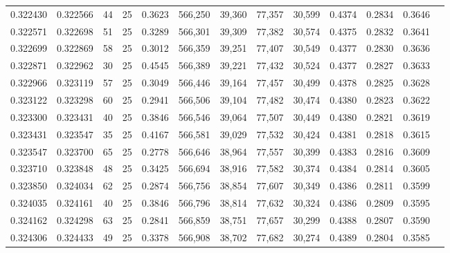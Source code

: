 \begin{tabular}{rrrrrrrrrrrrr}
0.322430 & 0.322566 &    44 &  25 &                                     0.3623 & 566,250 &  39,360 &  77,357 &  30,599 & 0.4374 & 0.2834 & 0.3646 \\
0.322571 & 0.322698 &    51 &  25 &                                     0.3289 & 566,301 &  39,309 &  77,382 &  30,574 & 0.4375 & 0.2832 & 0.3641 \\
0.322699 & 0.322869 &    58 &  25 &                                     0.3012 & 566,359 &  39,251 &  77,407 &  30,549 & 0.4377 & 0.2830 & 0.3636 \\
0.322871 & 0.322962 &    30 &  25 &                                     0.4545 & 566,389 &  39,221 &  77,432 &  30,524 & 0.4377 & 0.2827 & 0.3633 \\
0.322966 & 0.323119 &    57 &  25 &                                     0.3049 & 566,446 &  39,164 &  77,457 &  30,499 & 0.4378 & 0.2825 & 0.3628 \\
0.323122 & 0.323298 &    60 &  25 &                                     0.2941 & 566,506 &  39,104 &  77,482 &  30,474 & 0.4380 & 0.2823 & 0.3622 \\
0.323300 & 0.323431 &    40 &  25 &                                     0.3846 & 566,546 &  39,064 &  77,507 &  30,449 & 0.4380 & 0.2821 & 0.3619 \\
0.323431 & 0.323547 &    35 &  25 &                                     0.4167 & 566,581 &  39,029 &  77,532 &  30,424 & 0.4381 & 0.2818 & 0.3615 \\
0.323547 & 0.323700 &    65 &  25 &                                     0.2778 & 566,646 &  38,964 &  77,557 &  30,399 & 0.4383 & 0.2816 & 0.3609 \\
0.323710 & 0.323848 &    48 &  25 &                                     0.3425 & 566,694 &  38,916 &  77,582 &  30,374 & 0.4384 & 0.2814 & 0.3605 \\
0.323850 & 0.324034 &    62 &  25 &                                     0.2874 & 566,756 &  38,854 &  77,607 &  30,349 & 0.4386 & 0.2811 & 0.3599 \\
0.324035 & 0.324161 &    40 &  25 &                                     0.3846 & 566,796 &  38,814 &  77,632 &  30,324 & 0.4386 & 0.2809 & 0.3595 \\
0.324162 & 0.324298 &    63 &  25 &                                     0.2841 & 566,859 &  38,751 &  77,657 &  30,299 & 0.4388 & 0.2807 & 0.3590 \\
0.324306 & 0.324433 &    49 &  25 &                                     0.3378 & 566,908 &  38,702 &  77,682 &  30,274 & 0.4389 & 0.2804 & 0.3585 \\

\end{tabular}
